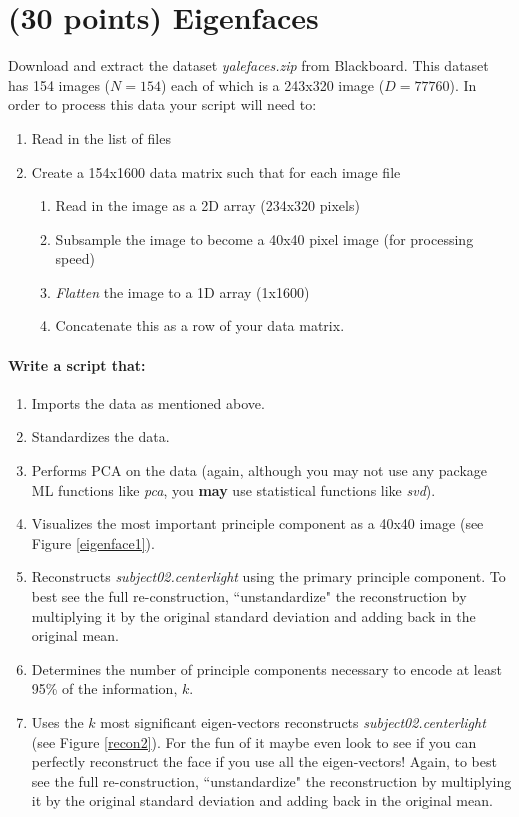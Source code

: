 \documentclass[12pt]{article}
\begin{document}
\newpage
\section{(30 points) Eigenfaces}\label{eigenface}
Download and extract the dataset \emph{yalefaces.zip} from Blackboard.  This dataset has 154 images ($N=154$) each of which is a 243x320 image ($D=77760$).  In order to process this data your script will need to:

\begin{enumerate}
\item Read in the list of files
\item Create a 154x1600 data matrix such that for each image file
	\begin{enumerate}
	\item Read in the image as a 2D array (234x320 pixels)
	\item Subsample the image to become a 40x40 pixel image (for processing speed)
	\item \emph{Flatten} the image to a 1D array (1x1600)
	\item Concatenate this as a row of your data matrix.
	\end{enumerate}
\end{enumerate}

\noindent
\paragraph{Write a script that:}
\begin{enumerate}
  \item Imports the data as mentioned above.
  \item Standardizes the data.
  \item Performs PCA on the data (again, although you may not use any package ML functions like \emph{pca}, you \textbf{may} use statistical functions like \emph{svd}).
    \item Visualizes the most important principle component as a 40x40 image (see Figure \ref{eigenface1}).
    \item Reconstructs \emph{subject02.centerlight} using the primary principle component.  To best see the full re-construction, ``unstandardize" the reconstruction by multiplying it by the original standard deviation and adding back in the original mean.
  \item Determines the number of principle components necessary to encode at least 95\% of the information, $k$.
 \item Uses the $k$ most significant eigen-vectors reconstructs \emph{subject02.centerlight}  (see Figure \ref{recon2}).  For the fun of it maybe even look to see if you can perfectly reconstruct the face if you use all the eigen-vectors!  Again, to best see the full re-construction, ``unstandardize" the reconstruction by multiplying it by the original standard deviation and adding back in the original mean.
\end{enumerate}
\end{document}
